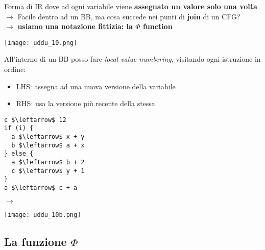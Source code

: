 \noindent\begin{minipage}[t]{.4\textwidth}
  \vspace{.5em}
Forma di IR dove ad ogni variabile viene \textbf{assegnato un valore solo una volta}\\ $\rightarrow$ Facile dentro ad un BB, ma cosa succede nei punti di \textbf{join} di un CFG?\\
$\rightarrow$ \textbf{usiamo una notazione fittizia: la $\Phi$ function}
\end{minipage}\hfill
\begin{minipage}[t]{.58\textwidth}
\begin{example}[frametitle={Local value numbering}]
  \begin{center}
    \texttt{[image: uddu\_10.png]}
  \end{center}

    All'interno di un BB posso fare \textit{local value numbering}, visitando ogni istruzione in ordine:
    \begin{itemize}
      \item LHS: assegna ad una nuova versione della variabile
      \item RHS: usa la versione pi\`u recente della stessa
    \end{itemize}

\end{example}
\end{minipage}

\noindent\begin{minipage}[c]{.4\textwidth}
\begin{lstlisting}
c $\leftarrow$ 12
if (i) {
  a $\leftarrow$ x + y
  b $\leftarrow$ a + x
} else {
  a $\leftarrow$ b + 2
  c $\leftarrow$ y + 1
}
a $\leftarrow$ c + a\end{lstlisting}
\end{minipage} \hfill $\rightarrow$ \hfill
\begin{minipage}[c]{.4\textwidth}
\texttt{[image: uddu\_10b.png]}
\end{minipage}

\subsection{La funzione $\Phi$}

